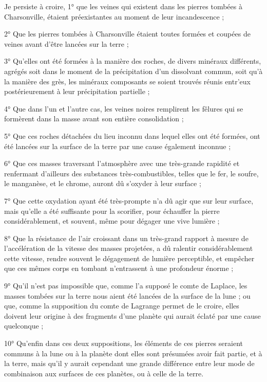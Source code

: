 \documentclass[a4paper, 12pt, oneside, french]{article}
\begin{document}
Je persiste à croire, 1° que les veines qui existent dans les pierres tombées à Charsonville, étaient préexistantes au moment de leur incandescence ;

2° Que les pierres tombées à Charsonville étaient toutes formées et coupées de veines avant d'être lancées sur la terre ;

3° Qu'elles ont été formées à la manière des roches, de divers minéraux différents, agrégés soit dans le moment de la précipitation d'un dissolvant commun, soit qu'à la manière des grès, les minéraux composants se soient trouvés réunis entr'eux postérieurement à leur précipitation partielle ;

4° Que dans l'un et l'autre cas, les veines noires remplirent les fêlures qui se formèrent dans la masse avant son entière consolidation ;

5° Que ces roches détachées du lieu inconnu dans lequel elles ont été formées, ont été lancées sur la surface de la terre par une cause également inconnue ;

6° Que ces masses traversant l'atmosphère avec une très-grande rapidité et renfermant d'ailleurs des substances très-combustibles, telles que le fer, le soufre, le manganèse, et le chrome, auront dû s'oxyder à leur surface ;

7° Que cette oxydation ayant été très-prompte n'a dû agir que sur leur surface, mais qu'elle a été suffisante pour la scorifier, pour échauffer la pierre considérablement, et souvent, même pour dégager une vive lumière ;

8° Que la résistance de l'air croissant dans un très-grand rapport à mesure de l'accélération de la vitesse des masses projetées, a dû ralentir considérablement cette vitesse, rendre souvent le dégagement de lumière perceptible, et empêcher que ces mêmes corps en tombant n'entrassent à une profondeur énorme ;

9° Qu'il n'est pas impossible que, comme l'a supposé le comte de Laplace, les masses tombées sur la terre nous aient été lancées de la surface de la lune ; ou que, comme la supposition du comte de Lagrange permet de le croire, elles doivent leur origine à des fragments d'une planète qui aurait éclaté par une cause quelconque ;

10° Qu'enfin dans ces deux suppositions, les éléments de ces pierres seraient communs à la lune ou à la planète dont elles sont présumées avoir fait partie, et à la terre, mais qu'il y aurait cependant une grande différence entre leur mode de combinaison aux surfaces de ces planètes, ou à celle de la terre.
\end{document}
